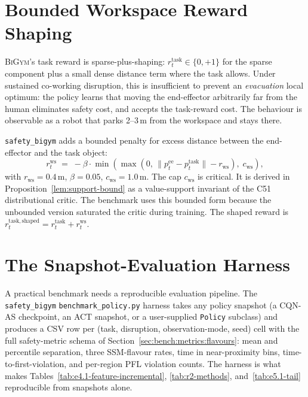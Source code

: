 \documentclass[11pt,a4paper]{report}
\newcommand{\pfl}{PFL}
\newcommand{\bigym}{\textsc{BiGym}}
\newcommand{\sbigym}{\texttt{safety\_bigym}}
\newcommand{\cqnas}{CQN-AS}
\begin{document}
\section{Bounded Workspace Reward Shaping}
\label{sec:bench:workspace}

\bigym{}'s task reward is sparse-plus-shaping: $r^{\mathrm{task}}_t
\in \{0, +1\}$ for the sparse component plus a small dense distance
term where the task allows. Under sustained co-working disruption,
this is insufficient to prevent an \emph{evacuation} local optimum:
the policy learns that moving the end-effector arbitrarily far from
the human eliminates safety cost, and accepts the task-reward cost.
The behaviour is observable as a robot that parks 2--3\,m from the
workspace and stays there.

\sbigym{} adds a bounded penalty for excess distance between the
end-effector and the task object:
\begin{equation}
  r^{\mathrm{ws}}_t \;=\; -\beta \cdot
    \min\!\left(
      \max(0,\, \|p^{\mathrm{ee}}_t - p^{\mathrm{task}}_t\| - r_{\mathrm{ws}})
      ,\; c_{\mathrm{ws}}
    \right),
  \label{eq:r-workspace}
\end{equation}
with $r_{\mathrm{ws}} = 0.4$\,m, $\beta = 0.05$, $c_{\mathrm{ws}} =
1.0$\,m. The cap $c_{\mathrm{ws}}$ is critical. It is derived in
Proposition~\ref{lem:support-bound} as a value-support invariant of
the C51 distributional critic. The benchmark uses this bounded form
because the unbounded version saturated the critic during training.
The shaped reward is $r^{\mathrm{task,shaped}}_t = r^{\mathrm{task}}_t
+ r^{\mathrm{ws}}_t$.

\section{The Snapshot-Evaluation Harness}
\label{sec:bench:harness}

A practical benchmark needs a reproducible evaluation pipeline. The
\sbigym{} \texttt{benchmark\_policy.py} harness takes any policy
snapshot (a \cqnas{} checkpoint, an ACT snapshot, or a user-supplied
\texttt{Policy} subclass) and produces a CSV row per (task,
disruption, observation-mode, seed) cell with the full safety-metric
schema of Section~\ref{sec:bench:metrics:flavours}: mean and
percentile separation, three SSM-flavour rates, time in
near-proximity bins, time-to-first-violation, and per-region
\pfl{} violation counts. The harness is what makes
Tables~\ref{tab:e4.1-feature-incremental}, \ref{tab:r2-methods},
and~\ref{tab:e5.1-tail} reproducible from snapshots alone.
\end{document}
